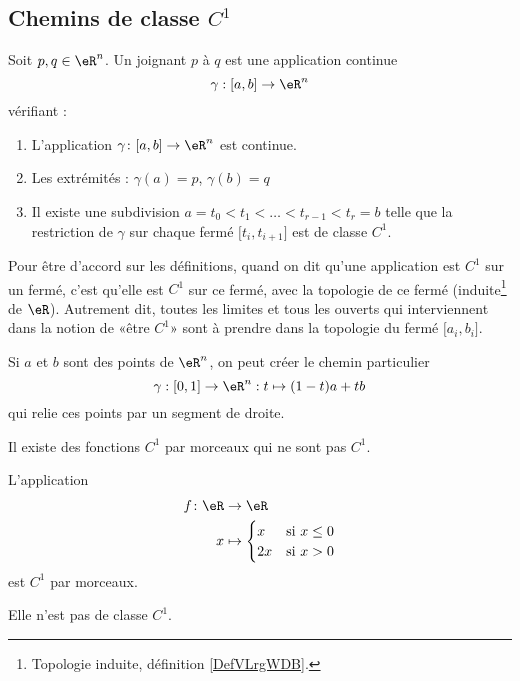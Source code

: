 \subsection{Chemins de classe \texorpdfstring{\( C^1\)}{C1}}

\begin{definition}      \label{DEFooQTAWooOCmSJo}
	Soit \( p, q\in \eR^n\). Un  joignant \( p\) à \( q\) est une application continue
	\begin{equation}
		\gamma : [a,b] \to \eR^n
	\end{equation}
	vérifiant :
	\begin{enumerate}
		\item
		      L'application \(\gamma \colon \mathopen[ a,b\mathclose]\to \eR^n  \) est continue.
		\item
		      Les extrémités : $\gamma(a) = p$, $\gamma(b) = q$
		\item
		      Il existe une subdivision \( a = t_0 < t_1 < \ldots < t_{r-1} < t_r = b\) telle que la restriction de \( \gamma\) sur chaque fermé \( \mathopen[t_i, t_{i+1}\mathclose]\) est de classe \( C^1\).
	\end{enumerate}
	Pour être d'accord sur les définitions, quand on dit qu'une application est \( C^1\) sur un fermé, c'est qu'elle est \( C^1\) sur ce fermé, avec la topologie de ce fermé (induite\footnote{Topologie induite, définition \ref{DefVLrgWDB}.} de \( \eR\)). Autrement dit, toutes les limites et tous les ouverts qui interviennent dans la notion de «être \( C^1\)» sont à prendre dans la topologie du fermé \( \mathopen[ a_i,b_i\mathclose]\).
\end{definition}

\begin{remark}
	Si \( a\) et \( b\) sont des points de \( \eR^n\), on peut créer le chemin particulier
	\begin{equation}
		\gamma : [0,1] \to \eR^n : t \mapsto (1-t)a + tb
	\end{equation}
	qui relie ces points par un segment de droite.
\end{remark}

Il existe des fonctions \( C^1\) par morceaux qui ne sont pas \( C^1\).
\begin{proposition}
	L'application
	\begin{equation}
		\begin{aligned}
			f\colon \eR & \to \eR                         \\
			x           & \mapsto \begin{cases}
				                      x  & \text{si } x\leq 0 \\
				                      2x & \text{si } x>0
			                      \end{cases}
		\end{aligned}
	\end{equation}
	est \( C^1\) par morceaux.

	Elle n'est pas de classe \( C^1\).
\end{proposition}


